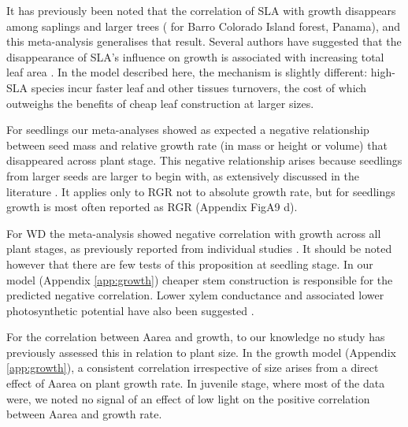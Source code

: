 \documentclass[a4paper]{article}\usepackage[]{graphicx}\usepackage[]{color}
\begin{document}
It has previously been noted that the correlation of SLA with growth disappears among saplings and larger trees (\citealt{Wright:2010tp} for Barro Colorado Island forest, Panama), and this meta-analysis generalises that result. Several authors have suggested that the disappearance of SLA's influence on growth is associated with increasing total leaf area \citep{Reich:1992wm,Poorter:2008iu,Wright:2010tp}. In the model described here, the mechanism is slightly different: high-SLA species incur faster leaf and other tissues turnovers, the cost of which outweighs the benefits of cheap leaf construction at larger sizes.

For seedlings our meta-analyses showed as expected a negative relationship between seed mass and relative growth rate (in mass or height or volume) that disappeared across plant stage. This negative relationship arises because seedlings from larger seeds are larger to begin with, as extensively discussed in the literature \citep[reviewed by][]{Turnbull:2012ew}. It applies only to RGR not to absolute growth rate, but for seedlings growth is most often reported as RGR (Appendix FigA9 d).

For WD the meta-analysis showed negative correlation with growth across all plant stages, as previously reported from individual studies \citep{Wright:2010tp,Ruger:2012jv}. It should be noted however that there are few tests of this proposition at seedling stage. In our model (Appendix \ref{app:growth}) cheaper stem construction is responsible for the predicted negative correlation. Lower xylem conductance and associated lower photosynthetic potential have also been suggested \citep[reviewed by][]{Chave:2009iy}. 

For the correlation between Aarea and growth, to our knowledge no study has previously assessed this in relation to plant size. In the growth model (Appendix \ref{app:growth}), a consistent correlation irrespective of size arises from a direct effect of Aarea on plant growth rate. In juvenile stage, where most of the data were, we noted no signal of an effect of low light on the positive correlation between Aarea and growth rate.
\end{document}
